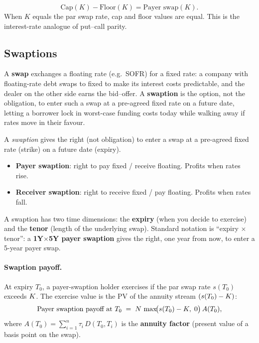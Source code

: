 \begin{keyfactbox}
\[
  \text{Cap}(K) - \text{Floor}(K) = \text{Payer swap}(K).
\]
When $K$ equals the par swap rate, cap and floor values are equal.
This is the interest-rate analogue of put--call parity.
\end{keyfactbox}

\subsection{Swaptions}

A \textbf{swap} exchanges a floating rate (e.g.\ SOFR) for a fixed
rate: a company with floating-rate debt swaps to fixed to make its
interest costs predictable, and the dealer on the other side earns
the bid--offer.  A \textbf{swaption} is the option, not the
obligation, to enter such a swap at a pre-agreed fixed rate on a
future date, letting a borrower lock in worst-case funding costs
today while walking away if rates move in their favour.

\begin{definition}[Swaption]
\label{def:swaption}
A \emph{swaption} gives the right (not obligation) to enter a swap
at a pre-agreed fixed rate (strike) on a future date (expiry).
\begin{itemize}
  \item \textbf{Payer swaption}: right to pay fixed / receive
    floating.  Profits when rates rise.
  \item \textbf{Receiver swaption}: right to receive fixed / pay
    floating.  Profits when rates fall.
\end{itemize}
\end{definition}

A swaption has two time dimensions: the \textbf{expiry} (when you
decide to exercise) and the \textbf{tenor} (length of the underlying
swap).  Standard notation is ``expiry $\times$ tenor'': a
\textbf{1Y$\times$5Y payer swaption} gives the right, one year from
now, to enter a 5-year payer swap.

\paragraph{Swaption payoff.}
At expiry $T_0$, a payer-swaption holder exercises if the par swap
rate $s(T_0)$ exceeds $K$.  The exercise value is the PV of
the annuity stream $(s(T_0) - K)$:
\begin{equation}
  \text{Payer swaption payoff at } T_0 \;=\;
    N \,\max\!\bigl(s(T_0) - K,\;0\bigr)\,A(T_0),
  \label{eq:swaption_payoff}
\end{equation}
where $A(T_0) = \sum_{i=1}^{n} \tau_i\, D(T_0, T_i)$ is the
\textbf{annuity factor} (present value of a basis point on the swap).

